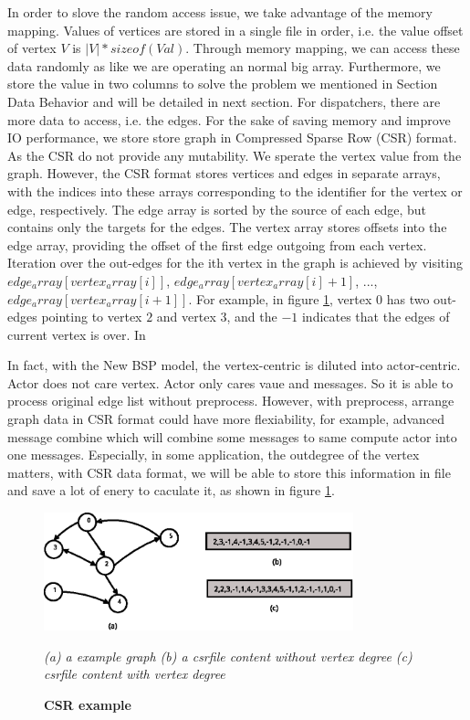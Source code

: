 \documentclass[twocolumn,a4paper,10pt]{article}
\begin{document}
In order to slove the random access issue, we take advantage of the memory mapping. Values of vertices are stored in a single file in order, i.e. the value offset of vertex $V$ is $|V|*sizeof(Val)$. Through memory mapping, we can access these data randomly as like we are operating an normal big array. Furthermore, we store the value in two columns to solve the problem we mentioned in Section Data Behavior and will be detailed in next section. \newline
For dispatchers, there are more data to access, i.e. the edges. For the sake of saving memory and improve IO performance, we store store graph in Compressed Sparse Row (CSR) format. As the CSR do not provide any mutability. We sperate the vertex value from the graph.  However, the CSR format stores vertices and edges in separate arrays, with the indices into these arrays corresponding to the identifier for the vertex or edge, respectively. The edge array is sorted by the source of each edge, but contains only the targets for the edges. The vertex array stores offsets into the edge array, providing the offset of the first edge outgoing from each vertex. Iteration over the out-edges for the ith vertex in the graph is achieved by visiting $edge_array[vertex_array[i]]$, $edge_ array[vertex_array[i]+1]$, ..., $edge_ array[vertex_array[i+1]]$. For example, in figure \ref{figure:csrexample}, vertex $0$ has two out-edges pointing to vertex  $2$ and vertex $3$, and the $-1$ indicates that the edges of current vertex is over. In 

In fact, with the New BSP model, the vertex-centric is diluted into actor-centric. Actor does not care vertex. Actor only cares vaue and messages. So it is able to process original edge list without preprocess. However, with preprocess, arrange graph data in CSR format could have more flexiability, for example, advanced message combine which will combine some messages to same compute actor into one messages. Especially, in some application, the outdegree of the vertex matters, with CSR data format, we will be able to store this information in file and save a lot of enery to caculate it, as shown in figure \ref{figure:csrexample}.


\begin{figure}[htbp]

 \begin{minipage}[]{0.5\textwidth}
 \centering
     \includegraphics[width=0.8\textwidth,angle=0,scale=1.2]{figure/csrdataformat.eps}
\end{minipage}
    \caption{\textbf{CSR example}  }
	\textit{(a) a example graph (b) a csrfile content without vertex degree (c) csrfile content with vertex degree}
    \label{figure:csrexample} 
\end{figure}
\end{document}
